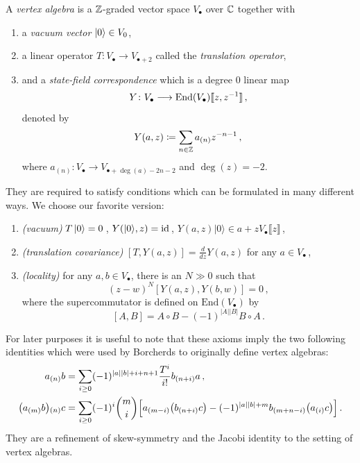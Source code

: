 \documentclass[a4paper, 12pt]{amsart}
\begin{document}
 \begin{definition}
 \label{Def: axioms}
 A \textit{vertex algebra} is a ${\mathbb{Z}}$-graded vector space $V_{\bullet}$ over ${\mathbb{C}}$ together with 
\begin{enumerate}
\item a \textit{vacuum vector} $\ket{0}\in V_0$, 
    \item a linear operator 
    $T\colon V_\bullet\to V_{\bullet+2}$
   called the \textit{translation operator},
    \item and a \textit{state-field correspondence} which is a degree 0 linear map
    $$
    Y\colon V_\bullet\longrightarrow {\rm End}(V_\bullet)\llbracket z,z^{-1} \rrbracket\,,
    $$
    denoted by 
    $$Y(a,z)\coloneqq \sum_{n\in{\mathbb{Z}}}{a_{(n)}}z^{-n-1}\,,
    $$
   where $a_{(n)}:V_\bullet\rightarrow V_{\bullet+\deg(a)-2n-2}$ and $\deg (z) =-2$.
\end{enumerate}

They are required to satisfy conditions which can be formulated in many different ways. We choose our favorite version:
\begin{enumerate}
    \item \textit{(vacuum)} $T\ket{0} = 0$\,, $Y(|0\rangle, z)=\textnormal{id}$\,, $Y(a,z)|0\rangle\in a+zV_\bullet\llbracket z\rrbracket$\,,
    \item \textit{(translation covariance)} $[T,Y(a,z)] = \frac{d}{dz} Y(a,z)$ for any $a\in V_\bullet$\,,
    \item \textit{(locality)} for any $a,b\in V_{\bullet}$, there is an $N\gg 0$ such that 
    $$
    (z-w)^N[Y(a,z),Y(b,w)] = 0\,,
    $$
    where the supercommutator is defined on $\text{End}(V_\bullet)$ by
    $$
    [A,B] =A\circ B -  (-1)^{|A| |B|}B\circ A\,.
    $$
\end{enumerate}
\end{definition}
For later purposes it is useful to note that these axioms imply the two following identities which were used by Borcherds \cite[Section 4]{Borcherds} to originally define vertex algebras:
\begin{align}
\label{Eq: skewsymmetry}
a_{(n)}b &= \sum_{i\geq 0}(-1)^{|a||b|+i+n+1}\frac{T^i}{i!} b_{(n+i)}a\,,\\
\label{Eq: skewjacobi}\big(a_{(m)}b\big)\raisebox{0.2 pt}{\ensuremath{_{(n)}}} c
&=\sum_{i\geq 0}(-1)^i \binom{m}{i}\Big[a_{(m-i)}\big(b_{(n+i)}c\big) -(-1)^{|a||b|+m}b_{(m+n-i)}\big(a_{(i)}c\big)\Big]\,.
\end{align}
They are a refinement of skew-symmetry and the Jacobi identity to the setting of vertex algebras. 
\end{document}

